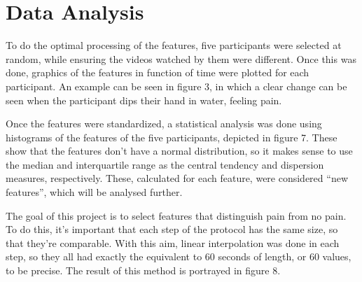 \section{Data Analysis}
To do the optimal processing of the features, five participants were selected at random, while ensuring the videos watched by them were different. 
Once this was done, graphics of the features in function of time were plotted for each participant. 
An example can be seen in figure 3, in which a clear change can be seen when the participant dips their hand in water, feeling pain. 

Once the features were standardized, a statistical analysis was done using histograms of the features of the five participants, depicted in figure 7. 
These show that the features don’t have a normal distribution, so it makes sense to use the median and interquartile range as the central tendency and dispersion measures, respectively. 
These, calculated for each feature, were considered “new features”, which will be analysed further.

The goal of this project is to select features that distinguish pain from no pain. 
To do this, it’s important that each step of the protocol has the same size, so that they’re comparable. 
With this aim, linear interpolation was done in each step, so they all had exactly the equivalent to 60 seconds of length, or 60 values, to be precise. 
The result of this method is portrayed in figure 8.









